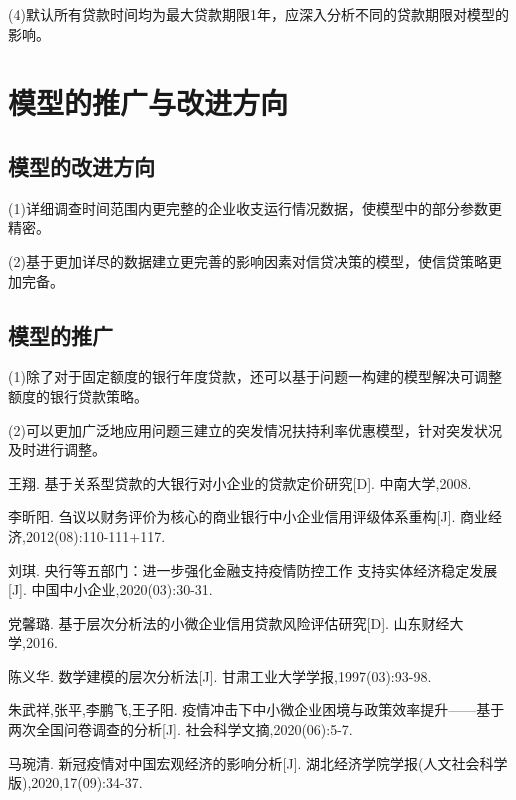 \documentclass[withoutpreface,bwprint]{cumcmthesis}
\begin{document}
(4)默认所有贷款时间均为最大贷款期限1年，应深入分析不同的贷款期限对模型的影响。

\section{模型的推广与改进方向}
\subsection{模型的改进方向}
(1)详细调查时间范围内更完整的企业收支运行情况数据，使模型中的部分参数更精密。 

(2)基于更加详尽的数据建立更完善的影响因素对信贷决策的模型，使信贷策略更加完备。

\subsection{模型的推广}
(1)除了对于固定额度的银行年度贷款，还可以基于问题一构建的模型解决可调整额度的银行贷款策略。

(2)可以更加广泛地应用问题三建立的突发情况扶持利率优惠模型，针对突发状况及时进行调整。

\begin{thebibliography}{9}%
    王翔. 
    \newblock 基于关系型贷款的大银行对小企业的贷款定价研究[D].
    \newblock 中南大学,2008.

    李昕阳.
    \newblock 刍议以财务评价为核心的商业银行中小企业信用评级体系重构[J].
    \newblock 商业经济,2012(08):110-111+117.

    刘琪.
    \newblock 央行等五部门：进一步强化金融支持疫情防控工作  支持实体经济稳定发展[J].
    \newblock 中国中小企业,2020(03):30-31.

    党馨璐.
    \newblock 基于层次分析法的小微企业信用贷款风险评估研究[D].
    \newblock 山东财经大学,2016.

    陈义华.
    \newblock 数学建模的层次分析法[J].
    \newblock 甘肃工业大学学报,1997(03):93-98.

    朱武祥,张平,李鹏飞,王子阳.
    \newblock 疫情冲击下中小微企业困境与政策效率提升——基于两次全国问卷调查的分析[J].
    \newblock 社会科学文摘,2020(06):5-7.

    马琬清.
    \newblock 新冠疫情对中国宏观经济的影响分析[J].
    \newblock 湖北经济学院学报(人文社会科学版),2020,17(09):34-37.
\end{thebibliography}
\end{document}
